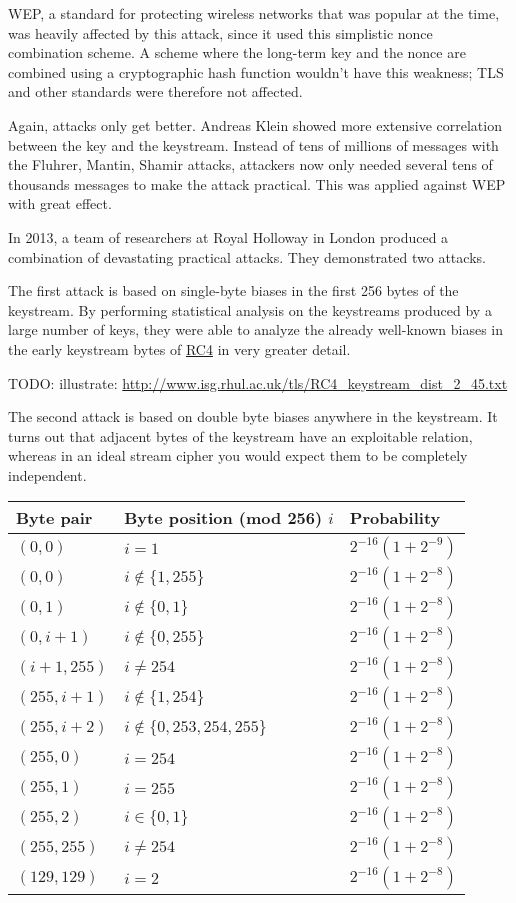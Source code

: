 \documentclass[11pt,ebook,table,dvipsnames]{memoir}
\begin{document}
WEP, a standard for protecting wireless networks that was popular at
the time, was heavily affected by this attack, since it used this
simplistic nonce combination scheme. A scheme where the long-term key
and the nonce are combined using a cryptographic hash function
wouldn't have this weakness; TLS and other standards were therefore
not affected.

Again, attacks only get better. Andreas Klein showed more extensive
correlation between the key and the keystream. \cite{klein:rc4}
Instead of tens of millions of messages with the Fluhrer, Mantin,
Shamir attacks, attackers now only needed several tens of thousands
messages to make the attack practical. This was applied against WEP
with great effect.

In 2013, a team of researchers at Royal Holloway in London produced a
combination of devastating practical attacks. \cite{rhul:rc4} They
demonstrated two attacks.

The first attack is based on single-byte biases in the first 256 bytes
of the keystream. By performing statistical analysis on the keystreams
produced by a large number of keys, they were able to analyze the
already well-known biases in the early keystream bytes of \hyperref[RC4]{RC4} in very
greater detail.

TODO: illustrate: \url{http://www.isg.rhul.ac.uk/tls/RC4_keystream_dist_2_45.txt}

The second attack is based on double byte biases anywhere in the
keystream. It turns out that adjacent bytes of the keystream have an
exploitable relation, whereas in an ideal stream cipher you would
expect them to be completely independent.

\begin{center}
\begin{tabular}{lll}
Byte pair & Byte position (mod 256) $i$ & Probability\\
\hline
$(0, 0)$ & $i = 1$ & $2^{-16} (1 + 2^{-9})$\\
$(0, 0)$ & $i \not \in \{{1, 255}\}$ & $2^{-16} (1 + 2^{-8})$\\
$(0, 1)$ & $i \not \in \{{0, 1}\}$ & $2^{-16} (1 + 2^{-8})$\\
$(0, i + 1)$ & $i \not \in \{{0, 255}\}$ & $2^{-16} (1 + 2^{-8})$\\
$(i + 1, 255)$ & $i \ne 254$ & $2^{-16} (1 + 2^{-8})$\\
$(255, i + 1)$ & $i \not \in \{{1, 254}\}$ & $2^{-16} (1 + 2^{-8})$\\
$(255, i + 2)$ & $i \not \in \{{0, 253, 254, 255}\}$ & $2^{-16} (1 + 2^{-8})$\\
$(255, 0)$ & $i = 254$ & $2^{-16} (1 + 2^{-8})$\\
$(255, 1)$ & $i = 255$ & $2^{-16} (1 + 2^{-8})$\\
$(255, 2)$ & $i \in \{{0, 1}\}$ & $2^{-16} (1 + 2^{-8})$\\
$(255, 255)$ & $i \ne 254$ & $2^{-16} (1 + 2^{-8})$\\
$(129, 129)$ & $i = 2$ & $2^{-16} (1 + 2^{-8})$\\
\end{tabular}
\end{center}
\end{document}
